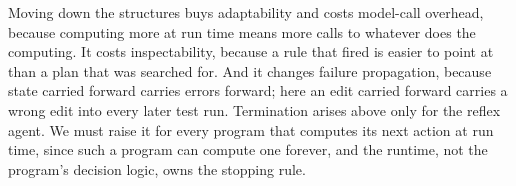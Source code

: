 Moving down the structures buys adaptability and costs model-call overhead, because computing
more at run time means more calls to whatever does the computing. It costs inspectability,
because a rule that fired is easier to point at than a plan that was searched for. And it
changes failure propagation, because state carried forward carries errors forward; here an
edit carried forward carries a wrong edit into every later test run. Termination arises above only for the reflex agent. We must raise it for every program that
computes its next action at run time, since such a program can compute one forever, and the
runtime, not the program's decision logic, owns the stopping rule.

